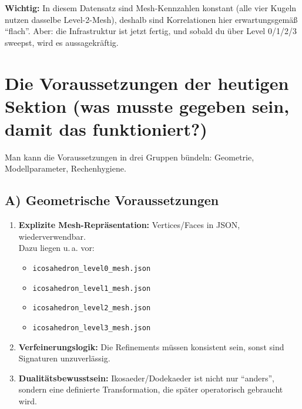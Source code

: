 \documentclass[11pt,a4paper]{article}
\begin{document}
\textbf{Wichtig:} In diesem Datensatz sind Mesh-Kennzahlen konstant (alle vier Kugeln nutzen dasselbe Level-2-Mesh), deshalb sind Korrelationen hier erwartungsgemäß ``flach''. Aber: die Infrastruktur ist jetzt fertig, und sobald du über Level 0/1/2/3 sweepst, wird es aussagekräftig.

\section{Die Voraussetzungen der heutigen Sektion (was musste gegeben sein, damit das funktioniert?)}

Man kann die Voraussetzungen in drei Gruppen bündeln: Geometrie, Modellparameter, Rechenhygiene.

\subsection{A) Geometrische Voraussetzungen}
\begin{enumerate}[leftmargin=*,itemsep=0.5em]
    \item \textbf{Explizite Mesh-Repräsentation:} Vertices/Faces in JSON, wiederverwendbar.\\
    Dazu liegen u.\,a. vor:
    \begin{itemize}[leftmargin=*,itemsep=0.3em]
        \item \texttt{icosahedron\_level0\_mesh.json}
        \item \texttt{icosahedron\_level1\_mesh.json}
        \item \texttt{icosahedron\_level2\_mesh.json}
        \item \texttt{icosahedron\_level3\_mesh.json}
    \end{itemize}
    \item \textbf{Verfeinerungslogik:} Die Refinements müssen konsistent sein, sonst sind Signaturen unzuverlässig.
    \item \textbf{Dualitätsbewusstsein:} Ikosaeder/Dodekaeder ist nicht nur ``anders'', sondern eine definierte Transformation, die später operatorisch gebraucht wird.
\end{enumerate}
\end{document}
